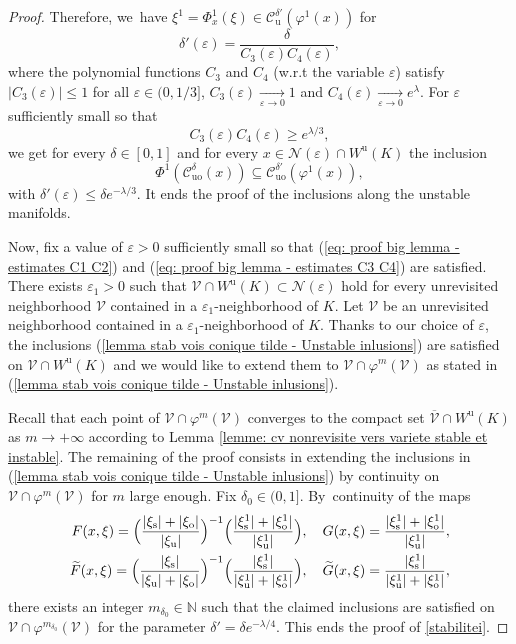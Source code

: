 \documentclass[11pt]{article}
\newcommand{\ro}{\mathrm{o}}
\newcommand{\rs}{\mathrm{s}}
\newcommand{\ru}{\mathrm{u}}
\newcommand{\ruo}{\mathrm{uo}}
\theoremstyle{definition}
\theoremstyle{plain}
\newcommand{\Ccal}{\mathcal{C}}
\newcommand{\Ncal}{\mathcal{N}}
\newcommand{\N}{\mathbb{N}}
\newcommand{\Vcal}{\mathcal{V}}
\begin{document}
\begin{proof}
Therefore, we~have $\xi^1 = \Phi_x^1 (\xi) \in \Ccal_\ru^{\delta'}(\varphi^1 (x))$ for
\[
\delta'(\varepsilon) = \frac{\delta }{C_3 (\varepsilon) C_4 (\varepsilon)},
\]
where the polynomial functions $C_3$ and $C_4$ (w.r.t the variable $\varepsilon$) satisfy $|C_3 (\varepsilon)| \leq 1$ for all $\varepsilon\in(0,1/3]$, $ C_3 (\varepsilon) \underset{\varepsilon \to 0}{\to} 1$ and $C_4 (\varepsilon) \underset{\varepsilon \to 0}{\to} e^{\lambda}$. For $\varepsilon$ sufficiently small so that
\begin{equation}\label{eq: proof big lemma - estimates C3 C4}
C_3 (\varepsilon) C_4 (\varepsilon) \geq e^{\lambda/3},
\end{equation}
we get for every $\delta\in[0,1]$ and for every $x \in \Ncal (\varepsilon) \cap W^\ru(K)$ the inclusion
\[
\Phi^{1}\left(\Ccal_{\ruo}^{\delta}(x)\right) \subseteq \Ccal_{\ruo}^{\delta'}(\varphi^{1}(x)),
\]
with $\delta' (\varepsilon) \leq \delta e^{-\lambda/3}$. It ends the proof of the inclusions along the unstable manifolds.

\medskip
Now, fix a value of $\varepsilon > 0$ sufficiently small so that (\ref{eq: proof big lemma - estimates C1 C2}) and (\ref{eq: proof big lemma - estimates C3 C4}) are satisfied. There exists $\varepsilon_1 > 0$ such that $\Vcal \cap W^\ru (K) \subset \Ncal (\varepsilon)$ hold for every unrevisited neighborhood $\Vcal$ contained in a $\varepsilon_1$-neighborhood of $K$. Let $\Vcal$ be an unrevisited neighborhood contained in a $\varepsilon_1$-neighborhood of $K$. Thanks to our choice of $\varepsilon$, the inclusions (\ref{lemma stab vois conique tilde - Unstable inlusions}) are satisfied on $\Vcal \cap W^\ru (K)$ and we would like to extend them to $\Vcal \cap \varphi^m(\Vcal)$ as stated in (\ref{lemma stab vois conique tilde - Unstable inlusions}).

Recall that each point of $\Vcal \cap \varphi^m (\Vcal)$ converges to the compact set $\overline{\Vcal} \cap W^\ru (K)$ as $m \to + \infty$ according to Lemma \ref{lemme: cv nonrevisite vers variete stable et instable}. The remaining of the proof consists in extending the inclusions in (\ref{lemma stab vois conique tilde - Unstable inlusions}) by continuity on $\Vcal \cap \varphi^m (\Vcal)$ for $m$ large enough. Fix $\delta_0\in(0,1]$. By~continuity of the maps
\begin{align*}
F (x,\xi) = \Bigl(\frac{|\xi_\rs| + |\xi_\ro|}{|\xi_\ru|}\Bigr)^{-1} \Bigl(\frac{|\xi_\rs^1| + |\xi_\ro^1|}{|\xi_\ru^1|} \Bigr), \quad G (x,\xi) = \frac{|\xi_\rs^1| + |\xi_\ro^1|}{|\xi_\ru^1|}, \\
\widetilde{F} (x,\xi) = \Bigl(\frac{|\xi_\rs|}{|\xi_\ru| + |\xi_\ro|}\Bigr)^{-1} \Bigl(\frac{|\xi_\rs^1|}{|\xi_\ru^1| + |\xi_\ro^1|} \Bigr), \quad \widetilde{G} (x,\xi) = \frac{|\xi_\rs^1|}{|\xi_\ru^1| + |\xi_\ro^1|},
\end{align*}
there exists an integer $m_{\delta_0} \in \N$ such that the claimed inclusions are satisfied on $\Vcal \cap \varphi^{m_{\delta_0}} (\Vcal)$ for the parameter $\delta' = \delta e^{-\lambda/4}$. This ends the proof of \eqref{stabilitei}.


\end{proof}
\end{document}
